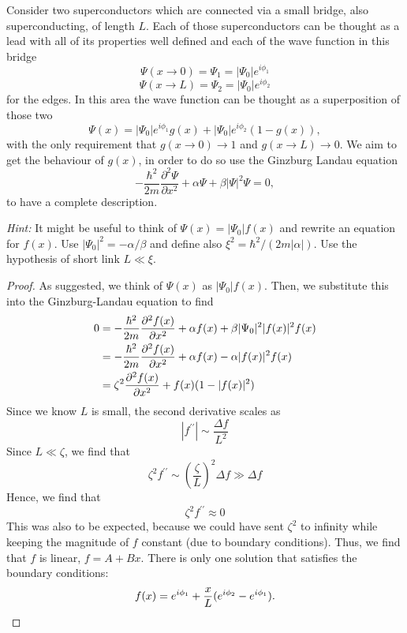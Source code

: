 \begin{Problem}

Consider two superconductors which are connected via a small bridge, also superconducting, of length $L$. Each of those superconductors can be thought as a lead with all of its properties well defined and each of the wave function in this bridge
\begin{equation}
\Psi(x \to 0) = \Psi_1 = |\Psi_0|e^{i\phi_1}
\end{equation}
\begin{equation}
\Psi(x \to L) = \Psi_2 = |\Psi_0|e^{i\phi_2}
\end{equation}
for the edges. In this area the wave function can be thought as a superposition of those two
\begin{equation}
\Psi(x) = |\Psi_0|e^{i\phi_1} g(x) + |\Psi_0|e^{i\phi_2}(1-g(x)),
\end{equation}
with the only requirement that $g(x \to 0) \to 1$ and $g(x \to L) \to 0$. We aim to get the behaviour of $g(x)$, in order to do so use the Ginzburg Landau equation
\begin{equation}
-\frac{\hbar^2}{2m}\frac{\partial^2\Psi}{\partial x^2}
+ \alpha \Psi + \beta|\Psi|^2\Psi = 0,
\end{equation}
to have a complete description.

\textit{Hint:} It might be useful to think of $\Psi(x)=|\Psi_0|f(x)$ and rewrite an equation for $f(x)$.
Use $|\Psi_0|^2=-\alpha/\beta$ and define also $\xi^2=\hbar^2/(2m|\alpha|)$. Use the hypothesis of short link $L \ll \xi$.
\end{Problem}
\begin{proof}
	As suggested, we think of $\Psi(x)$ as $|\Psi_0|f(x)$. Then, we substitute this into the Ginzburg-Landau equation to find
	\begin{align*}	
		0&=-\frac{\hbar^2}{2m}\pdv[2]{f(x)}{x}+ \alpha f(x) + \beta |\Psi_0|^2 |f(x)|^2f(x)\\
		&=-\frac{\hbar^2}{2m}\pdv[2]{f(x)}{x}+ \alpha f(x) -\alpha |f(x)|^2f(x)\\
		&= \zeta^2 \pdv[2]{f(x)}{x}+f(x)(1-|f(x)|^2)
	\end{align*}
Since we know $L$ is small, the second derivative scales as
\[|f^{\prime\prime}|\sim \frac{\Delta f}{L^2}\]
Since $L\ll\zeta$, we find that
\[\zeta^2 f^{\prime\prime}\sim \left(\frac{\zeta}{L}\right)^2\Delta f \gg \Delta f\]
Hence, we find that
\[\zeta^2 f^{\prime\prime}\approx 0\]
This was also to be expected, because we could have sent $\zeta^2$ to infinity while keeping the magnitude of $f$ constant (due to boundary conditions). Thus, we find that $f$ is linear, $f= A + B x$. There is only one solution that satisfies the boundary conditions:
\[f(x) = e^{i\phi_1}+\frac{x}{L}(e^{i\phi_2}-e^{i\phi_1}).\qedhere\]
\end{proof}

